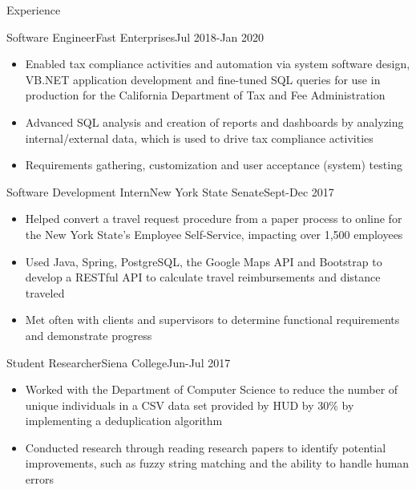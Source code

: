 \documentclass[]{xjavathehutt}
\begin{document}
\makeheader


\begin{cvsection}{Experience}
  \begin{cvsubsection}{Software Engineer}{Fast Enterprises}{Jul 2018-Jan 2020}
    \begin{itemize}
      \item{Enabled tax compliance activities and automation via
          system software design, VB.NET application development and fine-tuned SQL queries for use
        in production for the California Department of Tax and Fee Administration}
      \item{Advanced SQL analysis and creation of reports and dashboards by analyzing
        internal/external data, which is used to drive tax compliance activities}
      \item{Requirements gathering, customization and user acceptance (system) testing}
    \end{itemize}
  \end{cvsubsection}

  \begin{cvsubsection}{Software Development Intern}{New York State Senate}{Sept-Dec 2017}
    \begin{itemize}
      \item{Helped convert a travel request procedure from a paper process to online for the New York State's Employee Self-Service, impacting over 1,500 employees}
      \item{Used Java, Spring, PostgreSQL, the Google Maps API and Bootstrap to develop a RESTful API to calculate travel reimbursements and distance traveled}
      \item{Met often with clients and supervisors to determine functional requirements and demonstrate progress}
    \end{itemize}
  \end{cvsubsection}

  \begin{cvsubsection}{Student Researcher}{Siena College}{Jun-Jul 2017}
    \begin{itemize}
      \item{Worked with the Department of Computer Science to reduce the number of unique
        individuals in a CSV data set provided by HUD by 30\% by implementing a deduplication algorithm}
      \item{Conducted research through reading research papers to identify potential
        improvements, such as fuzzy string matching and the ability to handle human errors}
    \end{itemize}
  \end{cvsubsection}
\end{cvsection}
\end{document}
